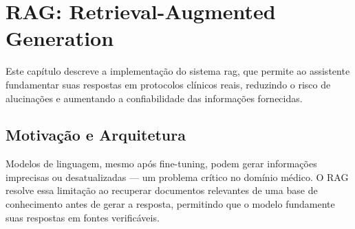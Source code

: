 
\chapter{RAG: Retrieval-Augmented Generation}\label{cap:rag}

Este capítulo descreve a implementação do sistema \acrfull{rag}, que permite ao assistente fundamentar suas respostas em protocolos clínicos reais, reduzindo o risco de alucinações e aumentando a confiabilidade das informações fornecidas.

\section{Motivação e Arquitetura}

Modelos de linguagem, mesmo após fine-tuning, podem gerar informações imprecisas ou desatualizadas --- um problema crítico no domínio médico. O RAG resolve essa limitação ao recuperar documentos relevantes de uma base de conhecimento antes de gerar a resposta, permitindo que o modelo fundamente suas respostas em fontes verificáveis.

